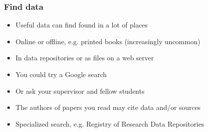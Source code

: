 \documentclass{beamer}
\begin{document}
\begin{frame}
  \frametitle{Find data}
  
  \begin{itemize}
  \item Useful data can find found in a lot of places
  \item Online or offline, e.g. printed books (increasingly uncommon)
  \item In data repositories or as files on a web server
  \item You could try a Google search
  \item Or ask your supervisor and fellow students
  \item The authors of papers you read may cite data and/or sources
  \item Specialized search, e.g. Registry of Research Data Repositories
  \end{itemize}
\end{frame}

{
	\begin{frame}[plain]
	\end{frame}
}
\end{document}
